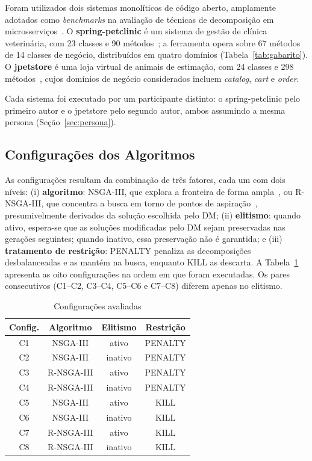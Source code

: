 \documentclass[conference]{IEEEtran}
\begin{document}
Foram utilizados dois sistemas monolíticos de código aberto, amplamente adotados como \textit{benchmarks} na avaliação de técnicas de decomposição em microsserviços~\cite{wang2024}. O \textbf{spring-petclinic} é um sistema de gestão de clínica veterinária, com 23 classes e 90 métodos~\cite{wang2024}; a ferramenta opera sobre 67 métodos de 14 classes de negócio, distribuídos em quatro domínios (Tabela~\ref{tab:gabarito}). O \textbf{jpetstore} é uma loja virtual de animais de estimação, com 24 classes e 298 métodos~\cite{wang2024}, cujos domínios de negócio considerados incluem \textit{catalog}, \textit{cart} e \textit{order}.

Cada sistema foi executado por um participante distinto: o spring-petclinic pelo primeiro autor e o jpetstore pelo segundo autor, ambos assumindo a mesma persona (Seção~\ref{sec:persona}).

\subsection{Configurações dos Algoritmos}\label{sec:configuracoes}

As configurações resultam da combinação de três fatores, cada um com dois níveis: (i) \textbf{algoritmo}: NSGA-III, que explora a fronteira de forma ampla~\cite{deb2014}, ou R-NSGA-III, que concentra a busca em torno de pontos de aspiração~\cite{vesikar2018}, presumivelmente derivados da solução escolhida pelo DM; (ii) \textbf{elitismo}: quando ativo, espera-se que as soluções modificadas pelo DM sejam preservadas nas gerações seguintes; quando inativo, essa preservação não é garantida; e (iii) \textbf{tratamento de restrição}: PENALTY penaliza as decomposições desbalanceadas e as mantém na busca, enquanto KILL as descarta. A Tabela~\ref{tab:configuracoes} apresenta as oito configurações na ordem em que foram executadas. Os pares consecutivos (C1--C2, C3--C4, C5--C6 e C7--C8) diferem apenas no elitismo.

\begin{table}[htbp]
\caption{Configurações avaliadas}
\label{tab:configuracoes}
\centering
\begin{tabular}{cccc}
\hline
\textbf{Config.} & \textbf{Algoritmo} & \textbf{Elitismo} & \textbf{Restrição} \\
\hline
C1 & NSGA-III   & ativo   & PENALTY \\
C2 & NSGA-III   & inativo & PENALTY \\
C3 & R-NSGA-III & ativo   & PENALTY \\
C4 & R-NSGA-III & inativo & PENALTY \\
C5 & NSGA-III   & ativo   & KILL \\
C6 & NSGA-III   & inativo & KILL \\
C7 & R-NSGA-III & ativo   & KILL \\
C8 & R-NSGA-III & inativo & KILL \\
\hline
\end{tabular}
\end{table}
\end{document}
